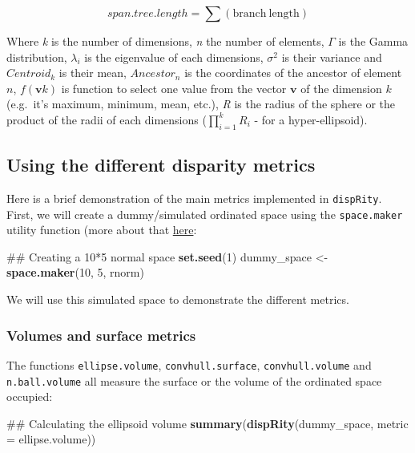 \documentclass[]{book}
\newenvironment{Shaded}{\begin{snugshade}}{\end{snugshade}}
\newcommand{\KeywordTok}[1]{\textcolor[rgb]{0.13,0.29,0.53}{\textbf{#1}}}
\newcommand{\DataTypeTok}[1]{\textcolor[rgb]{0.13,0.29,0.53}{#1}}
\newcommand{\DecValTok}[1]{\textcolor[rgb]{0.00,0.00,0.81}{#1}}
\newcommand{\StringTok}[1]{\textcolor[rgb]{0.31,0.60,0.02}{#1}}
\newcommand{\NormalTok}[1]{#1}
\theoremstyle{definition}
\theoremstyle{definition}
\theoremstyle{remark}
\begin{document}
\begin{equation}
    span.tree.length = \sum(\mathrm{branch\ length})
\end{equation}

Where \emph{k} is the number of dimensions, \emph{n} the number of
elements, \(\Gamma\) is the Gamma distribution, \(\lambda_i\) is the
eigenvalue of each dimensions, \(\sigma^{2}\) is their variance and
\(Centroid_{k}\) is their mean, \(Ancestor_{n}\) is the coordinates of
the ancestor of element \(n\), \(f(\mathbf{v}k)\) is function to select
one value from the vector \(\mathbf{v}\) of the dimension \(k\)
(e.g.~it's maximum, minimum, mean, etc.), \emph{R} is the radius of the
sphere or the product of the radii of each dimensions
(\(\displaystyle\prod_{i=1}^{k}R_{i}\) - for a hyper-ellipsoid).

\subsection{Using the different disparity
metrics}\label{using-the-different-disparity-metrics}

Here is a brief demonstration of the main metrics implemented in
\texttt{dispRity}. First, we will create a dummy/simulated ordinated
space using the \texttt{space.maker} utility function (more about that
\protect\hyperlink{space.maker}{here}:

\begin{Shaded}
\begin{Highlighting}[]
\NormalTok{## Creating a 10*5 normal space}
\KeywordTok{set.seed}\NormalTok{(}\DecValTok{1}\NormalTok{)}
\NormalTok{dummy_space <-}\StringTok{ }\KeywordTok{space.maker}\NormalTok{(}\DecValTok{10}\NormalTok{, }\DecValTok{5}\NormalTok{, rnorm)}
\end{Highlighting}
\end{Shaded}

We will use this simulated space to demonstrate the different metrics.

\subsubsection{Volumes and surface
metrics}\label{volumes-and-surface-metrics}

The functions \texttt{ellipse.volume}, \texttt{convhull.surface},
\texttt{convhull.volume} and \texttt{n.ball.volume} all measure the
surface or the volume of the ordinated space occupied:

\begin{Shaded}
\begin{Highlighting}[]
\NormalTok{## Calculating the ellipsoid volume}
\KeywordTok{summary}\NormalTok{(}\KeywordTok{dispRity}\NormalTok{(dummy_space, }\DataTypeTok{metric =}\NormalTok{ ellipse.volume))}
\end{Highlighting}
\end{Shaded}
\end{document}
